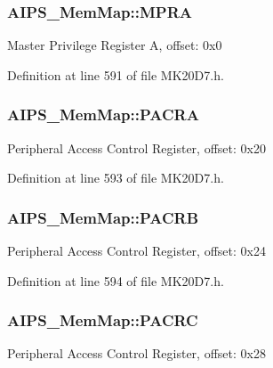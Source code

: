 \subsubsection[{\texorpdfstring{M\+P\+RA}{MPRA}}]{ A\+I\+P\+S\+\_\+\+Mem\+Map\+::\+M\+P\+RA}\hypertarget{struct_a_i_p_s___mem_map_a5ee5a8f31c77bbd35f1bb5f7a1f92c59}{}\label{struct_a_i_p_s___mem_map_a5ee5a8f31c77bbd35f1bb5f7a1f92c59}
Master Privilege Register A, offset\+: 0x0 

Definition at line 591 of file M\+K20\+D7.\+h.

\subsubsection[{\texorpdfstring{P\+A\+C\+RA}{PACRA}}]{ A\+I\+P\+S\+\_\+\+Mem\+Map\+::\+P\+A\+C\+RA}\hypertarget{struct_a_i_p_s___mem_map_a4b1afda7928f39099d6cc26a0b17da11}{}\label{struct_a_i_p_s___mem_map_a4b1afda7928f39099d6cc26a0b17da11}
Peripheral Access Control Register, offset\+: 0x20 

Definition at line 593 of file M\+K20\+D7.\+h.

\subsubsection[{\texorpdfstring{P\+A\+C\+RB}{PACRB}}]{ A\+I\+P\+S\+\_\+\+Mem\+Map\+::\+P\+A\+C\+RB}\hypertarget{struct_a_i_p_s___mem_map_aa6897cc68c3e0e6bff51c421049ba3f4}{}\label{struct_a_i_p_s___mem_map_aa6897cc68c3e0e6bff51c421049ba3f4}
Peripheral Access Control Register, offset\+: 0x24 

Definition at line 594 of file M\+K20\+D7.\+h.

\subsubsection[{\texorpdfstring{P\+A\+C\+RC}{PACRC}}]{ A\+I\+P\+S\+\_\+\+Mem\+Map\+::\+P\+A\+C\+RC}\hypertarget{struct_a_i_p_s___mem_map_acbd09d77313ec522210dbcabec37c9f5}{}\label{struct_a_i_p_s___mem_map_acbd09d77313ec522210dbcabec37c9f5}
Peripheral Access Control Register, offset\+: 0x28 

